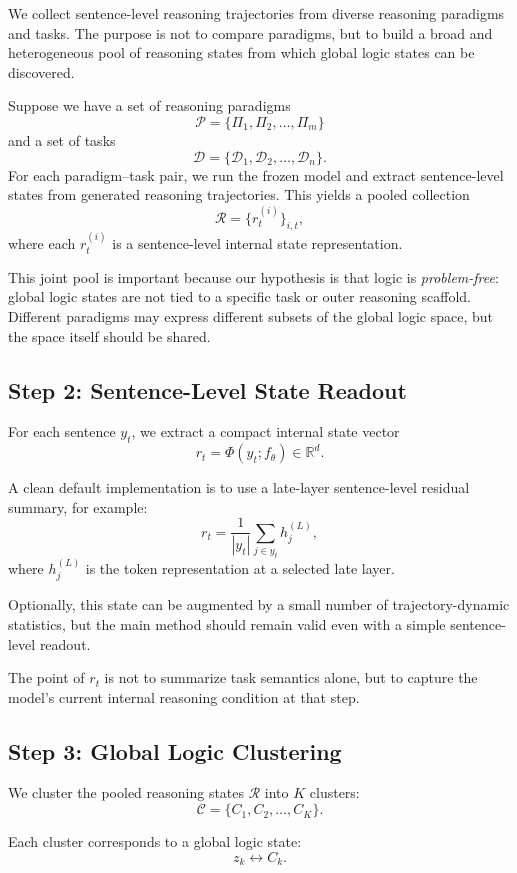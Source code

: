 \documentclass[11pt]{article}
\begin{document}
We collect sentence-level reasoning trajectories from diverse reasoning paradigms and tasks. The purpose is not to compare paradigms, but to build a broad and heterogeneous pool of reasoning states from which global logic states can be discovered.

Suppose we have a set of reasoning paradigms
\[
\mathcal{P} = \{\Pi_1,\Pi_2,\dots,\Pi_m\}
\]
and a set of tasks
\[
\mathcal{D} = \{\mathcal{D}_1,\mathcal{D}_2,\dots,\mathcal{D}_n\}.
\]
For each paradigm--task pair, we run the frozen model and extract sentence-level states from generated reasoning trajectories. This yields a pooled collection
\[
\mathcal{R} = \{r_t^{(i)}\}_{i,t},
\]
where each $r_t^{(i)}$ is a sentence-level internal state representation.

This joint pool is important because our hypothesis is that logic is \emph{problem-free}: global logic states are not tied to a specific task or outer reasoning scaffold. Different paradigms may express different subsets of the global logic space, but the space itself should be shared.

\subsection{Step 2: Sentence-Level State Readout}

For each sentence $y_t$, we extract a compact internal state vector
\[
r_t = \Phi(y_t; f_\theta)\in\mathbb{R}^d.
\]

A clean default implementation is to use a late-layer sentence-level residual summary, for example:
\[
r_t = \frac{1}{|y_t|}\sum_{j\in y_t} h_j^{(L)},
\]
where $h_j^{(L)}$ is the token representation at a selected late layer.

Optionally, this state can be augmented by a small number of trajectory-dynamic statistics, but the main method should remain valid even with a simple sentence-level readout.

The point of $r_t$ is not to summarize task semantics alone, but to capture the model's current internal reasoning condition at that step.

\subsection{Step 3: Global Logic Clustering}

We cluster the pooled reasoning states $\mathcal{R}$ into $K$ clusters:
\[
\mathcal{C} = \{C_1,C_2,\dots,C_K\}.
\]

Each cluster corresponds to a global logic state:
\[
z_k \leftrightarrow C_k.
\]
\end{document}
